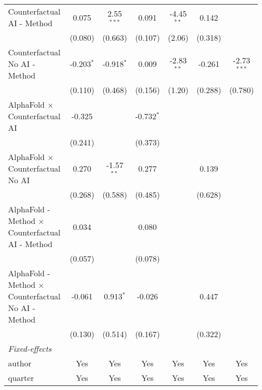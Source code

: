\begin{tabular}{lcccccc}
   Counterfactual AI - Method                                 & 0.075        & 2.55$^{***}$  & 0.091        & -4.45$^{**}$ & 0.142   &   \\   
                                                              & (0.080)      & (0.663)       & (0.107)      & (2.06)       & (0.318) &   \\   
   Counterfactual No AI - Method                              & -0.203$^{*}$ & -0.918$^{*}$  & 0.009        & -2.83$^{**}$ & -0.261  & -2.73$^{***}$\\   
                                                              & (0.110)      & (0.468)       & (0.156)      & (1.20)       & (0.288) & (0.780)\\   
   AlphaFold $\times$ Counterfactual AI                       & -0.325       &               & -0.732$^{*}$ &              &         &   \\   
                                                              & (0.241)      &               & (0.373)      &              &         &   \\   
   AlphaFold $\times$ Counterfactual No AI                    & 0.270        & -1.57$^{**}$  & 0.277        &              & 0.139   &   \\   
                                                              & (0.268)      & (0.588)       & (0.485)      &              & (0.628) &   \\   
   AlphaFold - Method $\times$ Counterfactual AI - Method     & 0.034        &               & 0.080        &              &         &   \\   
                                                              & (0.057)      &               & (0.078)      &              &         &   \\   
   AlphaFold - Method $\times$ Counterfactual No AI - Method  & -0.061       & 0.913$^{*}$   & -0.026       &              & 0.447   &   \\   
                                                              & (0.130)      & (0.514)       & (0.167)      &              & (0.322) &   \\   
   \midrule
   \emph{Fixed-effects}\\
   author                                                     & Yes          & Yes           & Yes          & Yes          & Yes     & Yes\\  
   quarter                                                    & Yes          & Yes           & Yes          & Yes          & Yes     & Yes\\  

\end{tabular}
